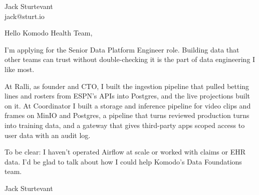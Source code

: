\documentclass[11pt]{article}
\begin{document}
\raggedright

{\namefont\fontsize{20pt}{24pt}\selectfont Jack Sturtevant}\\[-0.3em]
jack@sturt.io

\vspace{1.2em}

Hello Komodo Health Team,

I'm applying for the Senior Data Platform Engineer role. Building data that other teams can trust without double-checking it is the part of data engineering I like most.

At Ralli, as founder and CTO, I built the ingestion pipeline that pulled betting lines and rosters from ESPN's APIs into Postgres, and the live projections built on it. At Coordinator I built a storage and inference pipeline for video clips and frames on MinIO and Postgres, a pipeline that turns reviewed production turns into training data, and a gateway that gives third-party apps scoped access to user data with an audit log.

To be clear: I haven't operated Airflow at scale or worked with claims or EHR data. I'd be glad to talk about how I could help Komodo's Data Foundations team.

\vspace{0.6em}
Jack Sturtevant
\end{document}
